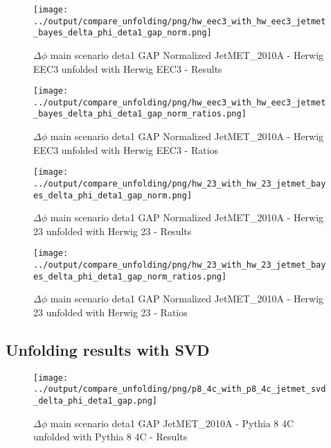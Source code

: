 \documentclass[11pt]{book}
\begin{document}
\begin{figure}[ht]
\centering
\texttt{[image: ../output/compare\_unfolding/png/hw\_eec3\_with\_hw\_eec3\_jetmet\_bayes\_delta\_phi\_deta1\_gap\_norm.png]}
\caption{$\Delta\phi$ main scenario deta1 GAP Normalized JetMET\_2010A - Herwig EEC3 unfolded with Herwig EEC3 - Results}
\label{hw_eec3_hw_eec3_jetmet_bayes_delta_phi_deta1_gap_norm_a}
\end{figure}

\begin{figure}[ht]
\centering
\texttt{[image: ../output/compare\_unfolding/png/hw\_eec3\_with\_hw\_eec3\_jetmet\_bayes\_delta\_phi\_deta1\_gap\_norm\_ratios.png]}
\caption{$\Delta\phi$ main scenario deta1 GAP Normalized JetMET\_2010A - Herwig EEC3 unfolded with Herwig EEC3 - Ratios}
\label{hw_eec3_hw_eec3_jetmet_bayes_delta_phi_deta1_gap_norm_b}
\end{figure}

\begin{figure}[ht]
\centering
\texttt{[image: ../output/compare\_unfolding/png/hw\_23\_with\_hw\_23\_jetmet\_bayes\_delta\_phi\_deta1\_gap\_norm.png]}
\caption{$\Delta\phi$ main scenario deta1 GAP Normalized JetMET\_2010A - Herwig 23 unfolded with Herwig 23 - Results}
\label{hw_23_hw_23_jetmet_bayes_delta_phi_deta1_gap_norm_a}
\end{figure}

\begin{figure}[ht]
\centering
\texttt{[image: ../output/compare\_unfolding/png/hw\_23\_with\_hw\_23\_jetmet\_bayes\_delta\_phi\_deta1\_gap\_norm\_ratios.png]}
\caption{$\Delta\phi$ main scenario deta1 GAP Normalized JetMET\_2010A - Herwig 23 unfolded with Herwig 23 - Ratios}
\label{hw_23_hw_23_jetmet_bayes_delta_phi_deta1_gap_norm_b}
\end{figure}


\clearpage
\subsection{Unfolding results with SVD}

\begin{figure}[ht]
\centering
\texttt{[image: ../output/compare\_unfolding/png/p8\_4c\_with\_p8\_4c\_jetmet\_svd\_delta\_phi\_deta1\_gap.png]}
\caption{$\Delta\phi$ main scenario deta1 GAP JetMET\_2010A - Pythia 8 4C unfolded with Pythia 8 4C - Results}
\label{p8_p8_jetmet_svd_delta_phi_deta1_gap_a}
\end{figure}
\end{document}
